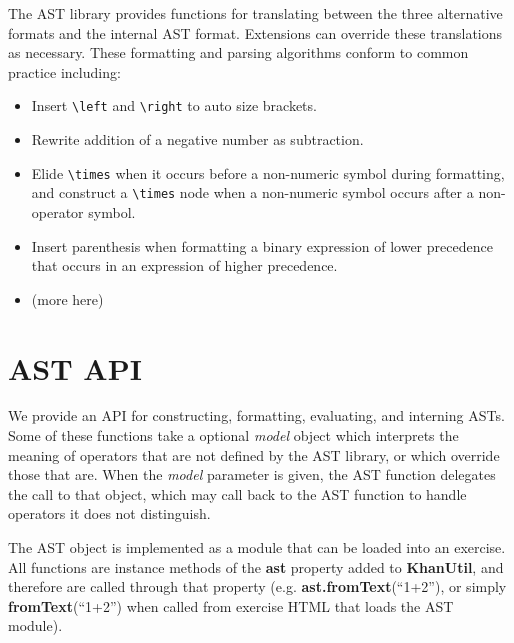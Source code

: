 \documentclass{article}
\begin{document}
The AST library provides functions for translating between the three alternative formats and the 
internal AST format. Extensions can override these translations as necessary. These formatting and 
parsing algorithms conform to common practice including:

\begin{itemize}
\item Insert \verb'\left' and \verb'\right' to auto size brackets.
\item Rewrite addition of a negative number as subtraction.
\item Elide \verb'\times' when it occurs before a non-numeric symbol during formatting, and construct 
      a \verb'\times' node when a non-numeric symbol occurs after a non-operator symbol.
\item Insert parenthesis when formatting a binary expression of lower precedence that occurs in an 
      expression of higher precedence.
\item (more here)
\end{itemize}

\section{AST API}

We provide an API for constructing, formatting, evaluating, and interning ASTs. Some of these
functions take a optional \emph{model} object which interprets the meaning of operators that are not 
defined by the AST library, or which override those that are. When the \emph{model} parameter is 
given, the AST function delegates the call to that object, which may call back to the AST function 
to handle operators it does not distinguish.

The AST object is implemented as a module that can be loaded into an exercise. All functions are 
instance methods of the {\bf ast} property added to {\bf KhanUtil}, and therefore are called through 
that property (e.g. {\bf ast.fromText}(``1+2''), or simply {\bf fromText}(``1+2'') when called from
exercise HTML that loads the AST module).
\end{document}
